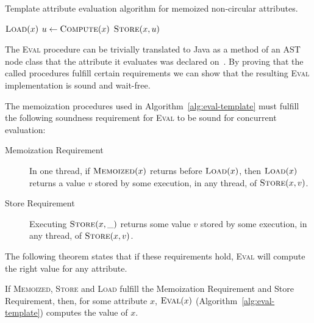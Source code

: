 {\begin{algorithm}
  \caption{Template attribute evaluation algorithm for memoized non-circular attributes.}
  \label{alg:eval-template}
  \begin{algorithmic}
      \State \Return $\textsc{Load}(x)$
    \Else
      \State $u \leftarrow \textsc{Compute}(x)$
      \State \Return $\textsc{Store}(x, u)$
    \EndIf
  \EndProcedure
  \end{algorithmic}
\end{algorithm}

The \textsc{Eval} procedure can be trivially translated to Java as a method of an AST node class
that the attribute it evaluates was declared on~\cite{DBLP:journals/informaticaSI/Hedin00}.
By proving that the called procedures fulfill certain requirements we can show that the resulting
\textsc{Eval} implementation is sound and wait-free.

The memoization procedures used in Algorithm~\ref{alg:eval-template} must fulfill the following
soundness requirement for \textsc{Eval} to be sound for concurrent evaluation:

\begin{description}
  \item[Memoization Requirement]
    In one thread,
    if $\textsc{Memoized}(x)$ returns \true{} before $\textsc{Load}(x)$,
    then $\textsc{Load}(x)$ returns a value $v$ stored
    by some execution, in any thread, of $\textsc{Store}(x, v)$.
  \item[Store Requirement]
    Executing $\textsc{Store}(x, \_)$ returns some value $v$ stored
    by some execution, in any thread, of $\textsc{Store}(x, v)$.
\end{description}

The following theorem states that if these requirements hold, \textsc{Eval} will compute the right
value for any attribute.

\begin{theorem}
  If \textsc{Memoized}, \textsc{Store} and \textsc{Load}
  fulfill the Memoization Requirement and Store Requirement,
  then, for some attribute $x$,
  $\textsc{Eval}(x)$ (Algorithm~\ref{alg:eval-template}) computes the value of $x$.

  \label{theorem:eval-sound}
\end{theorem}

}
